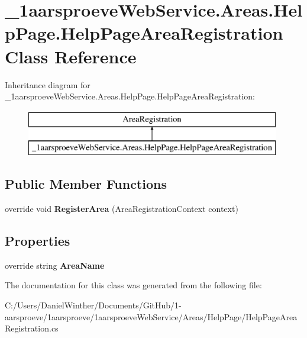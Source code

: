 \hypertarget{class__1aarsproeve_web_service_1_1_areas_1_1_help_page_1_1_help_page_area_registration}{}\section{\+\_\+1aarsproeve\+Web\+Service.\+Areas.\+Help\+Page.\+Help\+Page\+Area\+Registration Class Reference}
\label{class__1aarsproeve_web_service_1_1_areas_1_1_help_page_1_1_help_page_area_registration}
Inheritance diagram for \+\_\+1aarsproeve\+Web\+Service.\+Areas.\+Help\+Page.\+Help\+Page\+Area\+Registration\+:\begin{figure}[H]
\begin{center}
\leavevmode
\includegraphics[height=2.000000cm]{class__1aarsproeve_web_service_1_1_areas_1_1_help_page_1_1_help_page_area_registration}
\end{center}
\end{figure}
\subsection*{Public Member Functions}
\begin{DoxyCompactItemize}
\item 
\hypertarget{class__1aarsproeve_web_service_1_1_areas_1_1_help_page_1_1_help_page_area_registration_a2d995fdeaeb65a3da6b712389c462b39}{}override void {\bfseries Register\+Area} (Area\+Registration\+Context context)\label{class__1aarsproeve_web_service_1_1_areas_1_1_help_page_1_1_help_page_area_registration_a2d995fdeaeb65a3da6b712389c462b39}

\end{DoxyCompactItemize}
\subsection*{Properties}
\begin{DoxyCompactItemize}
\item 
\hypertarget{class__1aarsproeve_web_service_1_1_areas_1_1_help_page_1_1_help_page_area_registration_a9402b3b3aba317e0afa36ff4ddf0593f}{}override string {\bfseries Area\+Name}\label{class__1aarsproeve_web_service_1_1_areas_1_1_help_page_1_1_help_page_area_registration_a9402b3b3aba317e0afa36ff4ddf0593f}

\end{DoxyCompactItemize}


The documentation for this class was generated from the following file\+:\begin{DoxyCompactItemize}
\item 
C\+:/\+Users/\+Daniel\+Winther/\+Documents/\+Git\+Hub/1-\/aarsproeve/1aarsproeve/1aarsproeve\+Web\+Service/\+Areas/\+Help\+Page/Help\+Page\+Area\+Registration.\+cs\end{DoxyCompactItemize}
